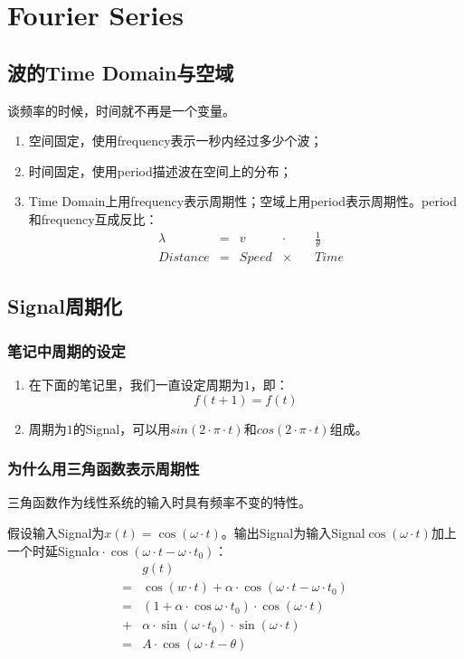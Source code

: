 \chapter{Fourier Series}
\section{波的Time Domain与空域}
谈频率的时候，时间就不再是一个变量。
\begin{enumerate}
	\item 空间固定，使用frequency表示一秒内经过多少个波；
	\item 时间固定，使用period描述波在空间上的分布；
	\item Time Domain上用frequency表示周期性；空域上用period表示周期性。period和frequency互成反比：
	      \begin{align*}
		       & \lambda  & = & v     & \cdot   \quad & \frac{1}{\theta} \\
		       & Distance & = & Speed & \times  \quad & Time
	      \end{align*}
\end{enumerate}


\section{Signal周期化}
\subsection{笔记中周期的设定}
\begin{enumerate}
	\item 在下面的笔记里，我们一直设定周期为$1$，即：
	      \begin{equation}
		      f(t+1)=f(t)
	      \end{equation}
	\item 周期为$1$的Signal，可以用$sin(2\cdot \pi \cdot t)$和$cos(2\cdot \pi \cdot t)$组成。

\end{enumerate}
\subsection{为什么用三角函数表示周期性}
三角函数作为线性系统的输入时具有频率不变的特性。

假设输入Signal为$x(t)=\cos (\omega\cdot t)$。输出Signal为输入Signal$\cos (\omega\cdot t)$加上一个时延Signal$\alpha\cdot \cos (\omega\cdot t-\omega\cdot t_0)$：
\begin{align*}

	  & g(t)                                                            \\
	= & \cos(w\cdot t)+\alpha\cdot \cos (\omega\cdot t-\omega\cdot t_0) \\
	= & (1+\alpha \cdot \cos\omega\cdot t_0)\cdot \cos (\omega\cdot t)  \\
	+ & \alpha\cdot \sin(\omega\cdot t_0)\cdot \sin(\omega\cdot t)      \\
	= & A\cdot \cos(\omega\cdot t-\theta)
\end{align*}

